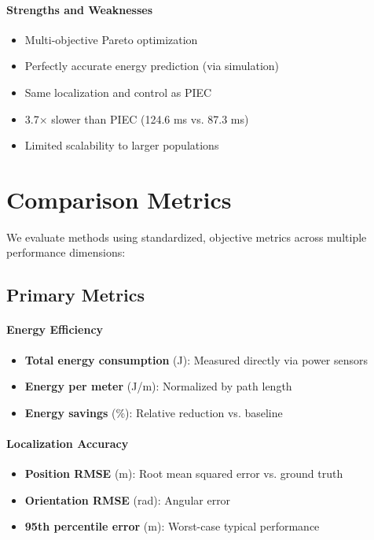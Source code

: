 \paragraph{Strengths and Weaknesses}
\begin{itemize}
    \item[\textcolor{green}{+}] Multi-objective Pareto optimization
    \item[\textcolor{green}{+}] Perfectly accurate energy prediction (via simulation)
    \item[\textcolor{green}{+}] Same localization and control as PIEC
    \item[\textcolor{red}{--}] 3.7$\times$ slower than PIEC (124.6 ms vs. 87.3 ms)
    \item[\textcolor{red}{--}] Limited scalability to larger populations
\end{itemize}

\section{Comparison Metrics}
\label{sec:comparison_metrics}

We evaluate methods using standardized, objective metrics across multiple performance dimensions:

\subsection{Primary Metrics}

\paragraph{Energy Efficiency}
\begin{itemize}
    \item \textbf{Total energy consumption} (J): Measured directly via power sensors
    \item \textbf{Energy per meter} (J/m): Normalized by path length
    \item \textbf{Energy savings} (\%): Relative reduction vs. baseline
\end{itemize}

\paragraph{Localization Accuracy}
\begin{itemize}
    \item \textbf{Position RMSE} (m): Root mean squared error vs. ground truth
    \item \textbf{Orientation RMSE} (rad): Angular error
    \item \textbf{95th percentile error} (m): Worst-case typical performance
\end{itemize}

